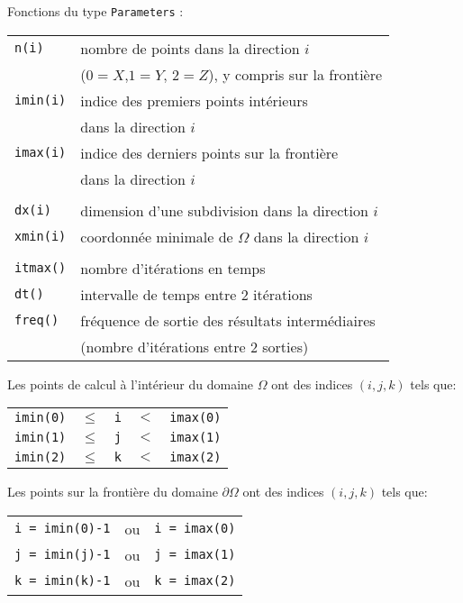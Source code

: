 \documentclass{beamer}
\begin{document}
\begin{frame}
	Fonctions du type {\tt Parameters} :
	\bigskip
	
	\begin{tabular}{ll}
		{\tt n(i)} & nombre de points dans la direction $i$ \\
		&  ($0=X$,$1=Y$, $2=Z$), y compris sur la frontière \\
		{\tt imin(i)}& indice des premiers points intérieurs \\ &  dans la direction $i$\\
		{\tt imax(i)}& indice des derniers points sur la frontière \\ & dans la direction $i$ \\ \\
		{\tt dx(i)} & dimension d'une subdivision dans la direction $i$\\
		{\tt xmin(i)} & coordonnée minimale de $\Omega$ dans la direction $i$ \\ \\
		{\tt itmax()} & nombre d'itérations en temps \\
		{\tt dt()} & intervalle de temps entre 2 itérations \\
		{\tt freq()} & fréquence de sortie des résultats intermédiaires \\
		& (nombre d'itérations entre 2 sorties)
	\end{tabular}
	
\end{frame}

\begin{frame}
	
\vfill
Les points de calcul à l'intérieur du domaine $\Omega$ ont des indices $(i,j,k)$ tels que:
\bigskip

\begin{tabular}{lclcl}
	{\tt imin(0)} & $\leq$ & {\tt i} & $<$ & {\tt imax(0)} \\
	{\tt imin(1)} & $\leq$ & {\tt j} & $<$ & {\tt imax(1)} \\
	{\tt imin(2)} & $\leq$ & {\tt k} & $<$ & {\tt imax(2)} \\
\end{tabular}
\vfill

Les points sur la frontière du domaine $\partial\Omega$ ont des indices $(i,j,k)$ tels que:
\bigskip

\begin{tabular}{lcl}
	{\tt i = imin(0)-1} & ou & {\tt i = imax(0)}  \\
	{\tt j = imin(j)-1} & ou & {\tt j = imax(1)}  \\
	{\tt k = imin(k)-1} & ou & {\tt k = imax(2)} 
\end{tabular}
\vfill
	
	
\end{frame}
\end{document}
